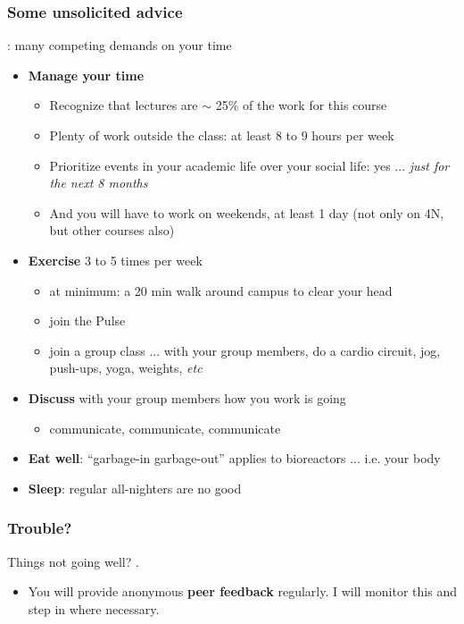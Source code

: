 \begin{frame}\frametitle{Some unsolicited advice}
	\begin{exampleblock}{}
		{} : many competing demands on your time
	\end{exampleblock}
	\begin{itemize}
		\item	\textbf{Manage your time}
		\begin{itemize}
			\item	Recognize that lectures are $\sim$ 25\% of the work for this course
			\item	Plenty of work outside the class: at least 8 to 9 hours per week
			\item	Prioritize events in your academic life over your social life: yes ... \emph{just for the next 8 months}
			\item	And you will have to work on weekends, at least 1 day (not only on 4N, but other courses also)
		\end{itemize}
		\pause
		\item	\textbf{Exercise} 3 to 5 times per week
		\begin{itemize}
			\item	at minimum: a 20 min walk around campus to clear your head
			\item	join the Pulse
			\item	join a group class ... with your group members, do a cardio circuit, jog, push-ups, yoga, weights, \emph{etc}
		\end{itemize}
		\pause
		\item	\textbf{Discuss} with your group members how you work is going
		\begin{itemize}
			\item	communicate, communicate, communicate
		\end{itemize}
		\item	\textbf{Eat well}: ``garbage-in garbage-out'' applies to bioreactors ... i.e. your body
		\item	\textbf{Sleep}: regular all-nighters are no good
	\end{itemize}
\end{frame}

\begin{frame}\frametitle{Trouble?}
	\begin{exampleblock}{}
		\vspace{12pt}
		Things not going well? {}.
		\vspace{12pt}
	\end{exampleblock}
	\begin{itemize}
		\item	You will provide anonymous \textbf{peer feedback} regularly. I will monitor this and step in where necessary.
	\end{itemize}
\end{frame}


